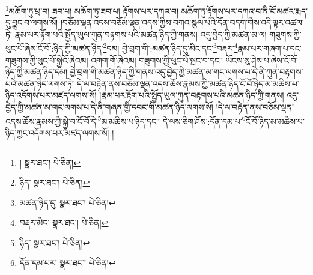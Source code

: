 \footnote{།    སྣར་ཐང་།  པེ་ཅིན། }མཆོག་ཏུ་ཕྲ་བ། ཟབ་པ། མཆོག་ཏུ་ཟབ་པ། རྟོགས་པར་དཀའ་བ། མཆོག་ཏུ་རྟོགས་པར་དཀའ་བ་ནི་ངོ་མཚར་རྨད་དུ་བྱུང་བ་ལགས་སོ། །བཅོམ་ལྡན་འདས་བཅོམ་ལྡན་འདས་ཀྱིས་བཀའ་སྩལ་པའི་དོན་བདག་གིས་འདི་ལྟར་འཚལ་ཏེ། རྣམ་པར་རྟོག་པའི་སྤྱོད་ཡུལ་ཀུན་བརྟགས་པའི་མཚན་ཉིད་ཀྱི་གནས། འདུ་བྱེད་ཀྱི་མཚན་མ་ལ། གཟུགས་ཀྱི་ཕུང་པོ་ཞེས་ངོ་བོ་:ཉིད་ཀྱི་མཚན་ཉིད་\footnote{ཉིད་  སྣར་ཐང་།  པེ་ཅིན། }དམ། བྱེ་བྲག་གི་:མཚན་ཉིད་དུ་མིང་དང་\footnote{མཚན་ཉིད་དུ་  སྣར་ཐང་།  པེ་ཅིན། }བརྡར་\footnote{བརྡར་མིང་  སྣར་ཐང་།  པེ་ཅིན། }རྣམ་པར་གཞག་པ་དང་གཟུགས་ཀྱི་ཕུང་པོ་སྐྱེའོ་ཞེའམ། འགག་གོ་ཞེའམ། གཟུགས་ཀྱི་ཕུང་པོ་སྤང་བ་དང་། ཡོངས་སུ་ཤེས་པ་ཞེས་ངོ་བོ་ཉིད་ཀྱི་མཚན་ཉིད་དམ། བྱེ་བྲག་གི་མཚན་ཉིད་ཀྱི་གནས་འདུ་བྱེད་ཀྱི་མཚན་མ་གང་ལགས་པ་དེ་ནི་ཀུན་བརྟགས་པའི་མཚན་ཉིད་ལགས་ཏེ། དེ་ལ་བརྟེན་ནས་བཅོམ་ལྡན་འདས་ཆོས་རྣམས་ཀྱི་མཚན་ཉིད་ངོ་བོ་ཉིད་མ་མཆིས་པ་ཉིད་འདོགས་པར་མཛད་ལགས་སོ། །རྣམ་པར་རྟོག་པའི་སྤྱོད་ཡུལ་ཀུན་བརྟགས་པའི་མཚན་ཉིད་ཀྱི་གནས། འདུ་བྱེད་ཀྱི་མཚན་མ་གང་ལགས་པ་དེ་ནི་གཞན་གྱི་དབང་གི་མཚན་ཉིད་ལགས་སོ། །དེ་ལ་བརྟེན་ནས་བཅོམ་ལྡན་འདས་ཆོས་རྣམས་ཀྱི་སྐྱེ་བ་ངོ་བོ་དེ་\footnote{ཉིད་  སྣར་ཐང་།  པེ་ཅིན། }མ་མཆིས་པ་ཉིད་དང་། དེ་ལས་ཅིག་ཤོས་:དོན་དམ་པ་\footnote{དོན་དམ་པར་  སྣར་ཐང་།  པེ་ཅིན། }ངོ་བོ་ཉིད་མ་མཆིས་པ་ཉིད་ཀྱང་འདོགས་པར་མཛད་ལགས་སོ། །
